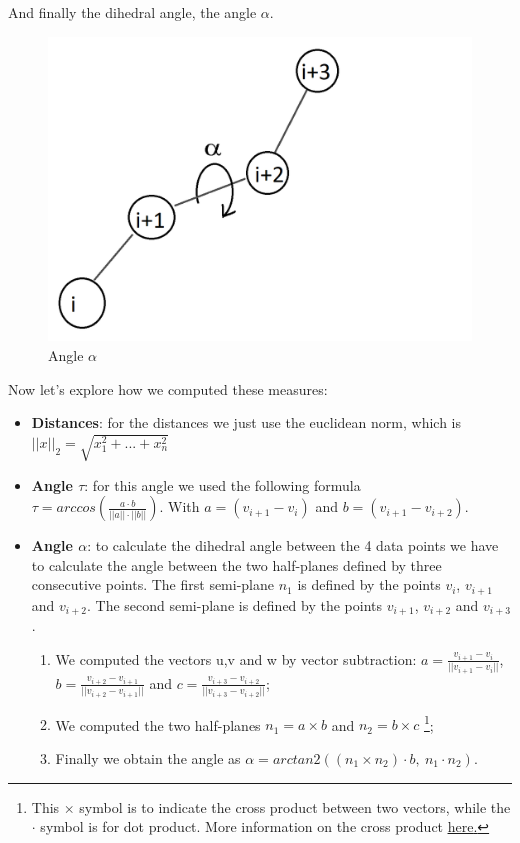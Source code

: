 \pagebreak
And finally the dihedral angle, the angle $\alpha$.

\begin{figure}[h!]
    \centering
    \includegraphics[scale=0.5]{res/dev/angleAlpha.png}
    \caption{Angle $\alpha$}
    \label{fig:enter-label}
\end{figure}

Now let's explore how we computed these measures:
\begin{itemize}
    \item \textbf{Distances}: for the distances we just use the euclidean norm, which is \\ {$||x||_2 = \sqrt{x_1^2 + ... + x_n^2}$}
    \item \textbf{Angle $\tau$}: for this angle we used the following formula \\ $\tau = arccos(\frac{a \cdot b}{||a|| \cdot ||b||})$. With $a = (v_{i+1}-v_i)$ and $b = (v_{i+1}-v_{i+2})$.  
    \item \textbf{Angle $\alpha$}: to calculate the dihedral angle between the 4 data points we have to calculate the angle between the two half-planes defined by three consecutive points. The first semi-plane $n_1$ is defined by the points $v_i$, $v_{i+1}$ and $v_{i+2}$. The second semi-plane is defined by the points $v_{i+1}$, $v_{i+2}$ and $v_{i+3}$.

    \pagebreak

    \begin{enumerate}
            \item We computed the vectors u,v and w by vector subtraction: $a = \frac{v_{i+1}-v_i}{||v_{i+1}-v_i||}$, $b = \frac{v_{i+2}-v_{i+1}}{||v_{i+2}-v_{i+1}||}$ and $c = \frac{v_{i+3}-v_{i+2}}{||v_{i+3}-v_{i+2}||}$;
            \item We computed the two half-planes $n_1 = a \times b$ and $n_2 = b \times c$ \footnote{This $\times$ symbol is to indicate the cross product between two vectors, while the $\cdot$ symbol is for dot product. More information on the cross product \href{https://en.wikipedia.org/wiki/Cross\_product}{\underline{here}.}};
            \item Finally we obtain the angle as $\alpha = arctan2((n_1\times n_2)\cdot b,\ n_1\cdot n_2)$.
    \end{enumerate}
\end{itemize}

